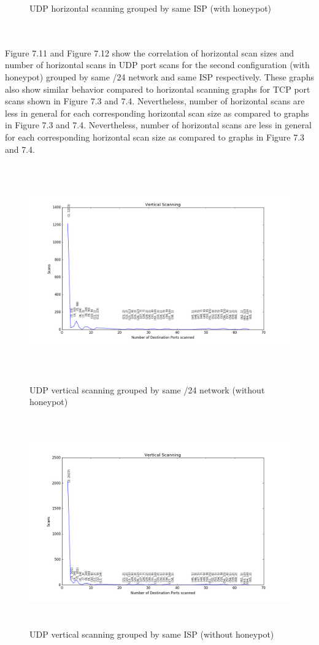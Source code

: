 \begin{figure}[h!]
\begin{minipage}{.535\textwidth}
  \caption{UDP horizontal scanning grouped by same ISP (with honeypot)}
  \label{fig:horizontalscanningudpsameispwithhoneypot}
\end{minipage}
\end{figure}
\\\\
Figure 7.11 and Figure 7.12  show the correlation of horizontal scan sizes and number of horizontal scans in UDP port scans for the second configuration (with honeypot) grouped by same /24 network and same ISP respectively.
These graphs also show similar behavior compared to  horizontal scanning graphs for TCP port scans shown in Figure 7.3 and 7.4.
Nevertheless, number of horizontal scans are less in general for each corresponding horizontal scan size as compared to graphs in Figure 7.3 and 7.4.
Nevertheless, number of horizontal scans are less in general for each corresponding horizontal scan size as compared to graphs in Figure 7.3 and 7.4.
\begin{figure}[p]
\centering
\includegraphics[width=15cm,height=9cm]{images/verticalscan_udp_classc}
\caption{ UDP vertical scanning grouped by same /24 network (without honeypot)}
\centering
\includegraphics[width=15cm,height=9cm]{images/verticalscan_udp_isp_first}
\caption{ UDP vertical scanning grouped by same ISP (without honeypot)}
\end{figure}
